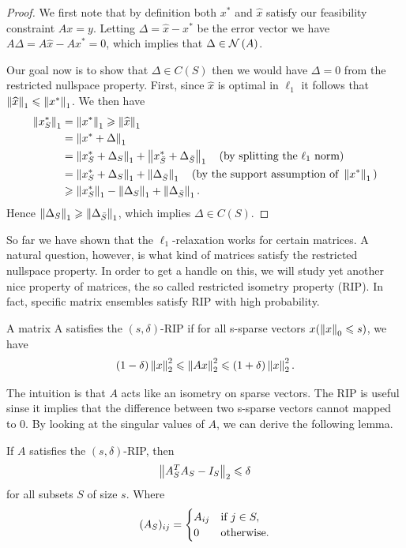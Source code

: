 \documentclass[11pt]{article}
\begin{document}
\begin{proof}
We first note that by definition both \(x^*\) and \(\widehat{x}\) satisfy our feasibility constraint \(A x=y\). Letting \(\Delta=\widehat{x}-x^*\) be the error vector we have \(A \Delta=A \widehat{x}-A x^*=0\), which implies that \(\Delta\in\mathcal N\left(A\right)\).

Our goal now is to show that \(\Delta\in C(S)\) then we would have \(\Delta=0\) from the restricted nullspace property. First, since \(\widehat{x}\) is optimal in \(\ell_1\) it follows that \(\left\|\widehat x\right\|_1\leqslant\left\|x^*\right\|_1\). We then have
\[\begin{aligned}
    \left\|x^*_S\right\|_1 &= \left\|x^*\right\|_1\geqslant \left\|\widehat x\right\|_1\\
    &= \left\|x^*+\Delta\right\|_1\\
    &= \left\|x^*_S+\Delta_S\right\|_1+\left\|x^*_{\bar S}+\Delta_{\bar S}\right\|_1\quad\textnormal{(by splitting the }\ell_1\textnormal{ norm)}\\
    &= \left\|x^*_S+\Delta_S\right\|_1+\left\|\Delta_{\bar S}\right\|_1\quad\textnormal{(by the support assumption of }\left\|x^*\right\|_1\textnormal{)}\\
    &\geqslant \left\|x^*_S\right\|_1-\left\|\Delta_S\right\|_1+\left\|\Delta_{\bar S}\right\|_1.
\end{aligned}\]
Hence \(\left\|\Delta_S\right\|_1\geqslant\left\|\Delta_{\bar S}\right\|_1\), which implies \(\Delta\in C(S)\).
\end{proof}

So far we have shown that the \(\ell_1\)-relaxation works for certain matrices. A natural question, however, is what kind of matrices satisfy the restricted nullspace property. In order to get a handle on this, we will study yet another nice property of matrices, the so called restricted isometry property (RIP). In fact, specific matrix ensembles satisfy RIP with high probability.

\begin{definition}
    A matrix A satisfies the \((s,\delta)\)-RIP if for all s-sparse vectors \(x(\left\|x\right\|_0 \leqslant s)\), we have
    \[(1 - \delta)\left\|x\right\|_2^2 \leqslant \left\|Ax\right\|^2_2 \leqslant (1 + \delta)\left\|x\right\|^2_2.\]
\end{definition}

The intuition is that \(A\) acts like an isometry on sparse vectors. The RIP is useful sinse it implies that the difference between two s-sparse vectors cannot mapped to 0. By looking at the singular values of \(A\), we can derive the following lemma.

\begin{lemma}\label{lem:rip}
    If \(A\) satisfies the \((s,\delta)\)-RIP, then 
    \[\left\|A^T_SA_S-I_S\right\|_2 \leqslant \delta\]
    for all subsets \(S\) of size \(s\). Where 
    \[(A_S)_{ij} = 
    \begin{cases}
        A_{ij} &\textnormal{if } j \in S,\\
        0 &\textnormal{otherwise}.
    \end{cases}\]
\end{lemma}
\end{document}
